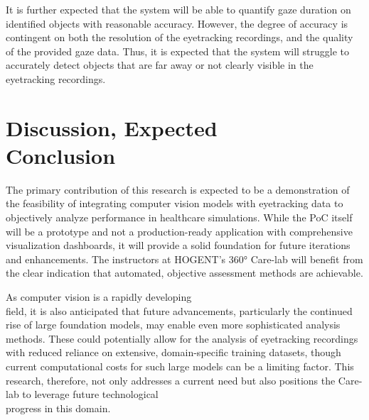 \documentclass[english]{hogent-article}
\begin{document}
It is further expected that the system will be able to quantify gaze duration on identified objects with reasonable accuracy.
However, the degree of accuracy is contingent on both the resolution of the eyetracking recordings, and the quality of the provided gaze data.
Thus, it is expected that the system will struggle to accurately detect objects that are far away or not clearly visible in the eyetracking recordings. 

\section{Discussion, Expected\\ Conclusion}
\label{sec:discussion-conclusion}

The primary contribution of this research is expected to be a demonstration of the feasibility of integrating computer vision models with eyetracking data to objectively analyze performance in healthcare simulations.
While the PoC itself will be a prototype and not a production-ready application with comprehensive visualization dashboards, it will provide a solid foundation for future iterations and enhancements.
The instructors at HOGENT's 360° Care-lab will benefit from the clear indication that automated, objective assessment methods are achievable.

As computer vision is a rapidly developing\\ field, it is also anticipated that future advancements, particularly the continued rise of large foundation models, may enable even more sophisticated analysis methods. 
These could potentially allow for the analysis of eyetracking recordings with reduced reliance on extensive, domain-specific training datasets, though current computational costs for such large models can be a limiting factor. 
This research, therefore, not only addresses a current need but also positions the Care-lab to leverage future technological\\ progress in this domain.

\printbibliography[heading=bibintoc]
\end{document}
